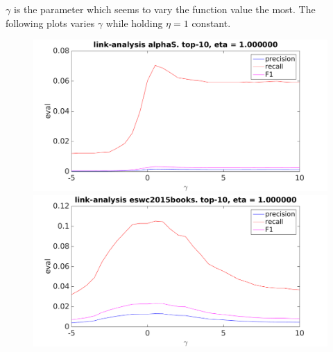 $\gamma$ is the parameter which seems to vary the function value the most. The following plots varies $\gamma$ while holding $\eta = 1$ constant.

\FloatBarrier

\begin{figure}[h!]
\centering
\begin{minipage}{.5\textwidth}
    \centering
    \includegraphics[width=\linewidth]{fig/link_gamma/alphaS_link_gamma.png}
\end{minipage}%
\begin{minipage}{.5\textwidth}
    \centering
    \includegraphics[width=\linewidth]{fig/link_gamma/eswc2015books_link_gamma.png}
\end{minipage}
\end{figure}

